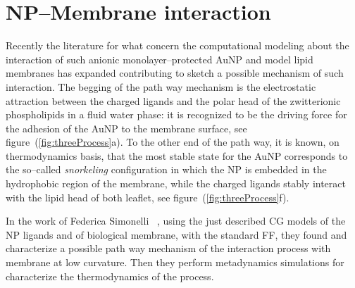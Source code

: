 \section{NP--Membrane interaction}
Recently the literature for what concern the computational modeling about the interaction of such anionic monolayer--protected \ac{AuNP} and model lipid membranes has expanded contributing to sketch a possible mechanism of such interaction. The begging of the path way mechanism is the electrostatic attraction between the charged ligands and the polar head of the zwitterionic phospholipids in a fluid water phase: it is recognized to be the driving force for the adhesion of the \ac{AuNP} to the membrane surface, see figure~(\ref{fig:threeProcess}a). To the other end of the path way, it is known, on thermodynamics basis, that the most stable state for the \ac{AuNP} corresponds to the so--called \textit{snorkeling} configuration in which the \ac{NP} is embedded in the hydrophobic region of the membrane, while the charged ligands stably interact with the lipid head of both leaflet, see figure~(\ref{fig:threeProcess}f). 

In the work of Federica Simonelli \etal\, \cite{ourPaper}, using the just described \ac{CG} \martini models of the \ac{NP} ligands and of biological membrane, with the standard \martini \ac{FF}, they found and characterize a possible path way mechanism of the interaction process with membrane at low curvature. Then they perform metadynamics simulations for characterize the thermodynamics of the process.

